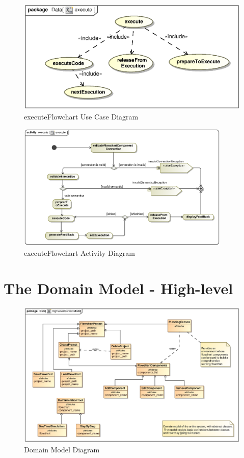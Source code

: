 \documentclass[12pt,a4paper,titlepage]{article}
\begin{document}
\begin{figure}[H]
  \centering
\includegraphics[width=500px]{execute.eps}
\caption{executeFlowchart Use Case Diagram}
\end{figure}

\begin{figure}[H]
  \centering
\includegraphics[width=385px]{executeAct.eps}
\caption{executeFlowchart Activity Diagram}
\end{figure}

\newpage
\section{The Domain Model - High-level}
\begin{figure}[H]
  \centering
\includegraphics[width=500px]{HighLevelDomainModel.eps}
\caption{Domain Model Diagram}
\end{figure}

\newpage


\newpage


\end{document}
